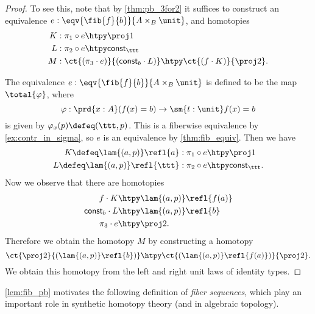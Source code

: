 \begin{proof}
To see this, note that by \cref{thm:pb_3for2} it suffices to construct an equivalence $e:\eqv{\fib{f}{b}}{A\times_B \unit}$, and homotopies
\begin{align*}
K & : \pi_1\circ e \htpy \proj 1 \\
L & : \pi_2\circ e \htpy \mathsf{const}_\ttt \\
M & : \ct{(\pi_3 \cdot e)}{(\mathsf{const}_b \cdot L)} \htpy \ct{(f \cdot K)}{\proj 2}.
\end{align*}

The equivalence $e:\eqv{\fib{f}{b}}{A\times_B \unit}$ is defined to be the map $\total{\varphi}$, where 
\begin{equation*}
\varphi : \prd{x:A} (f(x)=b)\to \sm{t:\unit} f(x)=b
\end{equation*}
is given by $\varphi_x(p)\defeq (\ttt,p)$. This is a fiberwise equivalence by \cref{ex:contr_in_sigma}, so $e$ is an equivalence by \cref{thm:fib_equiv}. Then we have
\begin{align*}
K\defeq \lam{(a,p)}\refl{a} & : \pi_1\circ e \htpy \proj 1 \\
L \defeq  \lam{(a,p)}\refl{\ttt} & : \pi_2\circ e \htpy \mathsf{const}_\ttt.
\end{align*}
Now we observe that there are homotopies
\begin{align*}
f\cdot K & \htpy \lam{(a,p)} \refl{f(a)} \\
\mathsf{const}_b \cdot L & \htpy \lam{(a,p)}\refl{b} \\
\pi_3\cdot e & \htpy \proj 2.
\end{align*}
Therefore we obtain the homotopy $M$ by constructing a homotopy
\begin{equation*}
\ct{\proj 2}{(\lam{(a,p)}\refl{b})} \htpy \ct{(\lam{(a,p)} \refl{f(a)})}{\proj 2}.
\end{equation*}
We obtain this homotopy from the left and right unit laws of identity types.
\end{proof}

\cref{lem:fib_pb} motivates the following definition of \emph{fiber sequences}, which play an important role in synthetic homotopy theory (and in algebraic topology). 


